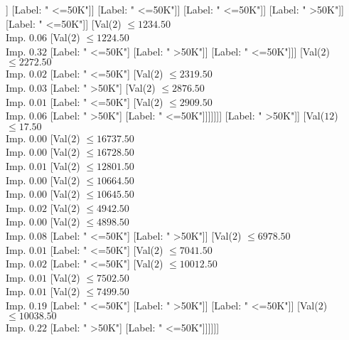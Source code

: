 \documentclass[margin=10pt]{standalone}
\begin{document}
\begin{forest}
																[Label: " <=50K"]]
															[Label: " <=50K"]]
														[Label: " <=50K"]]
													[Label: " <=50K"]]
												[Label: " >50K"]]
											[Label: " <=50K"]]
										[Val($2$) $ \leq 1234.50$ \\ Imp. $0.06$
											[Val($2$) $ \leq 1224.50$ \\ Imp. $0.32$
												[Label: " <=50K"]
												[Label: " >50K"]]
											[Label: " <=50K"]]]
									[Val($2$) $ \leq 2272.50$ \\ Imp. $0.02$
										[Label: " <=50K"]
										[Val($2$) $ \leq 2319.50$ \\ Imp. $0.03$
											[Label: " >50K"]
											[Val($2$) $ \leq 2876.50$ \\ Imp. $0.01$
												[Label: " <=50K"]
												[Val($2$) $ \leq 2909.50$ \\ Imp. $0.06$
													[Label: " >50K"]
													[Label: " <=50K"]]]]]]]
							[Label: " >50K"]]
						[Val($12$) $ \leq 17.50$ \\ Imp. $0.00$
							[Val($2$) $ \leq 16737.50$ \\ Imp. $0.00$
								[Val($2$) $ \leq 16728.50$ \\ Imp. $0.01$
									[Val($2$) $ \leq 12801.50$ \\ Imp. $0.00$
										[Val($2$) $ \leq 10664.50$ \\ Imp. $0.00$
											[Val($2$) $ \leq 10645.50$ \\ Imp. $0.02$
												[Val($2$) $ \leq 4942.50$ \\ Imp. $0.00$
													[Val($2$) $ \leq 4898.50$ \\ Imp. $0.08$
														[Label: " <=50K"]
														[Label: " >50K"]]
													[Val($2$) $ \leq 6978.50$ \\ Imp. $0.01$
														[Label: " <=50K"]
														[Val($2$) $ \leq 7041.50$ \\ Imp. $0.02$
															[Label: " <=50K"]
															[Val($2$) $ \leq 10012.50$ \\ Imp. $0.01$
																[Val($2$) $ \leq 7502.50$ \\ Imp. $0.01$
																	[Val($2$) $ \leq 7499.50$ \\ Imp. $0.19$
																		[Label: " <=50K"]
																		[Label: " >50K"]]
																	[Label: " <=50K"]]
																[Val($2$) $ \leq 10038.50$ \\ Imp. $0.22$
																	[Label: " >50K"]
																	[Label: " <=50K"]]]]]]

\end{forest}
\end{document}
